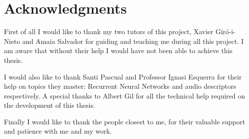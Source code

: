 \chapter*{Acknowledgments}

First of all I would like to thank my two tutors of this project, Xavier Giró-i-Nieto and Amaia Salvador for guiding and teaching me during all this project. I am aware that without their help I would have not been able to achieve this thesis.

I would also like to thank Santi Pascual and Professor Ignasi Esquerra for their help on topics they master: Recurrent Neural Networks and audio descriptors respectively. A special thanks to Albert Gil for all the technical help required on the development of this thesis. 

Finally I would like to thank the people closest to me, for their valuable support and patience with me and my work.
